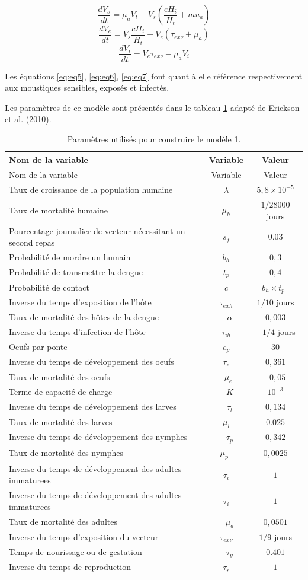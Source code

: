 \documentclass[
  12pt,
  french,
  oneside]{article}
\begin{document}
\begin{equation} \frac{dV_s}{dt} = \mu_aV_t - V_s \left(\frac{cH_i}{H_t} + mu_a\right)\label{eq:eq5}\end{equation}
\begin{equation} \frac{dV_e}{dt} = V_s \frac{cH_i}{H_t} - V_e \left(\tau_{ex\nu} + \mu_a\right)\label{eq:eq6}\end{equation}
\begin{equation} \frac{dV_i}{dt} = V_e\tau_{ex\nu} - \mu_aV_i \label{eq:eq7}\end{equation}

Les équations \ref{eq:eq5}, \ref{eq:eq6}, \ref{eq:eq7} font quant à elle
référence respectivement aux moustiques sensibles, exposés et infectés.

Les paramètres de ce modèle sont présentés dans le tableau \ref{tbl:1}
adapté de Erickson et al. (2010).

\begin{longtable}[]{@{}lcc@{}}
\caption{Paramètres utilisés pour construire le modèle 1.
\label{tbl:1}}\tabularnewline
\toprule
Nom de la variable & Variable & Valeur\tabularnewline
\midrule
\endfirsthead
\toprule
Nom de la variable & Variable & Valeur\tabularnewline
\midrule
\endhead
Taux de croissance de la population humaine & \(\lambda\) &
\(5,8\times 10^{-5}\)\tabularnewline
Taux de mortalité humaine & \(\mu_h\) & \(1/28000\) jours\tabularnewline
Pourcentage journalier de vecteur nécessitant un second repas & \(s_f\)
& \(0.03\)\tabularnewline
Probabilité de mordre un humain & \(b_h\) & \(0,3\)\tabularnewline
Probabilité de transmettre la dengue & \(t_p\) & \(0,4\)\tabularnewline
Probabilité de contact & \(c\) & \(b_h \times t_p\)~\tabularnewline
Inverse du temps d'exposition de l'hôte & \(\tau_{exh}\) & \(1/10\)
jours\tabularnewline
Taux de mortalité des hôtes de la dengue & ~ \(\alpha\) &
\(0,003\)\tabularnewline
Inverse du temps d'infection de l'hôte & \(\tau_{ih}\) & ~ \(1/4\)
jours\tabularnewline
Oeufs par ponte & \(e_p\) & \(30\)\tabularnewline
Inverse du temps de développement des oeufs & \(\tau_e\) &
\(0,361\)\tabularnewline
Taux de mortalité des oeufs & ~\(\mu_e\) & ~\(0,05\)\tabularnewline
Terme de capacité de charge & ~ \(K\) & \(10^{-3}\)\tabularnewline
Inverse du temps de développement des larves & ~ \(\tau_l\) &
\(0,134\)\tabularnewline
Taux de mortalité des larves & \(\mu_l\) & \(0.025\)\tabularnewline
Inverse du temps de développement des nymphes & ~ \(\tau_p\) &
\(0,342\)\tabularnewline
Taux de mortalité des nymphes & \(\mu_p\)~ & \(0,0025\)\tabularnewline
Inverse du temps de développement des adultes immaturees & \(\tau_i\) &
\(1\)\tabularnewline
Inverse du temps de développement des adultes immaturees & \(\tau_i\) &
\(1\)\tabularnewline
Taux de mortalité des adultes & ~ \(\mu_a\) & \(0,0501\)\tabularnewline
Inverse du temps d'exposition du vecteur & \(\tau_{ex\nu}\) & \(1/9\)
jours\tabularnewline
Temps de nourissage ou de gestation & ~ \(\tau_g\) &
\(0.401\)\tabularnewline
Inverse du temps de reproduction & \(\tau_r\) & \(1\)\tabularnewline
\bottomrule
\end{longtable}
\end{document}
